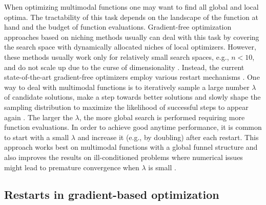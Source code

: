 \documentclass{article} %
\begin{document}
When optimizing multimodal functions one may want to find all global and local optima. 
The tractability of this task depends on the landscape of the function at hand and the budget of function evaluations.  
Gradient-free optimization approaches based on niching methods \citep{preuss2015niching} usually can deal with this task 
by covering the search space with dynamically allocated niches of local optimizers. 
However, these methods usually work only for relatively small search spaces, e.g., $n < 10$, and 
do not scale up due to the curse of dimensionality \citep{preuss2010niching}. 
Instead, the current state-of-the-art gradient-free optimizers employ various restart 
mechanisms \citep{hansen2009benchmarking,loshchilov2012alternative}.  
One way to deal with multimodal functions is to iteratively sample a large number $\lambda$ 
of candidate solutions, make a step towards better solutions and slowly shape the sampling distribution to maximize the likelihood of successful steps to appear again \citep{hansen2004evaluating}. 
The larger the $\lambda$, the more global search is performed requiring more function evaluations. 
In order to achieve good anytime performance, it is common to start with a small $\lambda$ and increase it (e.g., by doubling) after each restart. This approach works best on multimodal functions with a global funnel structure 
and also improves the results on ill-conditioned problems where numerical issues might lead to premature convergence when $\lambda$ is small \citep{hansen2009benchmarking}.

\subsection{Restarts in gradient-based optimization}
\end{document}

